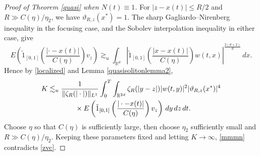 \documentclass[reqno,11pt]{amsart}
\theoremstyle{plain}
\theoremstyle{definition}
\numberwithin{equation}{section}
\numberwithin{theorem}{section}
\def\leq{\leqslant}
\def\R{\mathbb{R}}
\begin{document}
\begin{proof}[Proof of Theorem \ref{quasi} when $N(t)\equiv1$]
For $|z-x(t)|\leq R/2$ and $R\gg C(\eta)/\eta_2$, we have
$\vartheta_{R,z}(x^{\ast})=1$. The sharp Gagliardo--Nirenberg inequality
in the focusing case, and the Sobolev interpolation inequality in either case, give
\[
 E\left(\tilde{1}_{[0,1]}
       \left(\frac{|\cdot-x(t)|}{C(\eta)}\right)v_z\right)
 \gtrsim_u\int_{\R^d}\left|\tilde{1}_{[0,1]}
       \left(\frac{|x-x(t)|}{C(\eta)}\right)w(t,x)\right|^{\frac{2(d+2)}d}\,dx.
\]
Hence by \eqref{localized} and Lemma \ref{quasisolitonlemma2},
\begin{align}\label{zvc}
 K\lesssim_u{}&\frac1{\|\zeta_R(|\cdot|)\|_{L^1}}
 \int_0^T\int_{\R^{2d}}\zeta_R(|y-z|)|w(t,y)|^2
 |\vartheta_{R,z}(x^{\ast})|^4\notag\\
 &\qquad\times E\left(\tilde{1}_{[0,1]}
       \left(\frac{|\cdot-x(t)|}{C(\eta)}\right)v_z\right)\,dy\,dz\,dt.
\end{align}
Choose $\eta$ so that $C(\eta)$ is sufficiently large, then choose $\eta_2$
sufficiently small and $R\gg C(\eta)/\eta_2$. Keeping these parameters
fixed and letting $K\to\infty$, \eqref{mmmn} contradicts \eqref{zvc}.
\end{proof}
\end{document}
